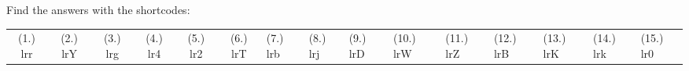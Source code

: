     
  \label{m38796**end}
          
       
    
  \label{804a55a564ee3ef49c7d42dbc9e03fae**end}
    
\par {} Find the answers with the shortcodes:
 \par \begin{tabular}[h]{cccccc}
 (1.) lrr  &  (2.) lrY  &  (3.) lrg  &  (4.) lr4  &  (5.) lr2  &  (6.) lrT  &  (7.) lrb  &  (8.) lrj  &  (9.) lrD  &  (10.) lrW  &  (11.) lrZ  &  (12.) lrB  &  (13.) lrK  &  (14.) lrk  &  (15.) lr0  & \end{tabular}



